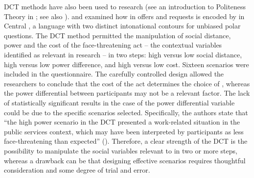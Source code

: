 \documentclass[output=paper]{LSP/langsci}
\begin{document}
DCT methods have also been used to research   (see an introduction to Politeness Theory in \citealt{Brown1987}; see also \citealt{Astruc2011,Astruc2016offers,Borras-Comes2015,Astruc2016offers}). \citet{Astruc2011} and \citet{Astruc2016offers} examined how  in offers and requests is encoded by  in Central , a language with two distinct intonational contours for unbiased polar questions. The DCT method permitted the manipulation of social distance, power and the cost of the face-threatening act -- the contextual variables identified as relevant in  research -- in two steps: high versus low social distance, high versus low power difference, and high versus low cost. Sixteen scenarios were included in the questionnaire. The carefully controlled design allowed the researchers to conclude that the cost of the act determines the choice of , whereas the power differential between participants may not be a relevant factor. The lack of statistically significant results in the case of the power differential variable could be due to the specific scenarios selected. Specifically, the authors state that “the high power scenario in the DCT presented a work-related situation in the public services context, which may have been interpreted by participants as less face-threatening than expected” (\citealt[110]{Astruc2016offers}). Therefore, a clear strength of the DCT is the possibility to manipulate the social variables relevant to  in two or more steps, whereas a drawback can be that designing effective scenarios requires thoughtful consideration and some degree of trial and error.
\end{document}
